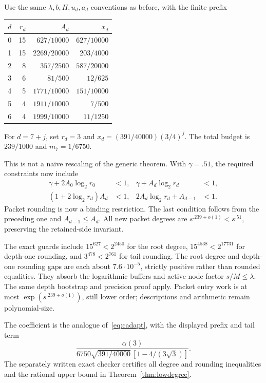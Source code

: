 \documentclass[11pt,letterpaper]{article}
\theoremstyle{remark}\newtheorem{remark}[theorem]{Remark}
\begin{document}
Use the same $\lambda,b,H,u_d,a_d$ conventions as before, with the finite prefix
\begin{center}\small
\begin{tabular}{@{}rrrr@{}}\toprule
$d$&$r_d$&$A_d$&$x_d$\\\midrule
0&15&$627/10000$&$627/10000$\\
1&15&$2269/20000$&$203/4000$\\
2&8&$357/2500$&$587/20000$\\
3&6&$81/500$&$12/625$\\
4&5&$1771/10000$&$151/10000$\\
5&4&$1911/10000$&$7/500$\\
6&4&$1999/10000$&$11/1250$\\\bottomrule
\end{tabular}
\end{center}
For $d=7+j$, set $r_d=3$ and $x_d=(391/40000)(3/4)^j$. The total budget is $239/1000$ and $m_7=1/6750$.

This is not a naive rescaling of the generic theorem. With $\gamma=.51$, the required constraints now include
\begin{align*}
 \gamma+2A_0\log_2r_0&<1,&\gamma+A_d\log_2r_d&<1,\\
 (1+2\log_2r_d)A_d&<1,&2A_d\log_2r_d+A_{d-1}&<1.
\end{align*}
Packet rounding is now a binding restriction. The last condition follows from the preceding one and $A_{d-1}\le A_d$. All new packet degrees are $s^{.239+o(1)}<s^{.51}$, preserving the retained-side invariant.

The exact guards include $15^{627}<2^{2450}$ for the root degree, $15^{4538}<2^{17731}$ for depth-one rounding, and $3^{478}<2^{761}$ for tail rounding. The root degree and depth-one rounding gaps are each about $7.6\cdot10^{-5}$, strictly positive rather than rounded equalities. They absorb the logarithmic buffers and active-node factor $s/M\le\lambda$. The same depth bootstrap and precision proof apply. Packet entry work is at most $\exp(s^{.239+o(1)})$, still lower order; descriptions and arithmetic remain polynomial-size.

The coefficient is the analogue of~\eqref{eq:cadapt}, with the displayed prefix and tail term
\[
 \frac{\alpha(3)}{6750\sqrt{391/40000}\,[1-4/(3\sqrt3)]}.
\]
The separately written exact checker certifies all degree and rounding inequalities and the rational upper bound in Theorem~\ref{thm:lowdegree}.
\end{document}
